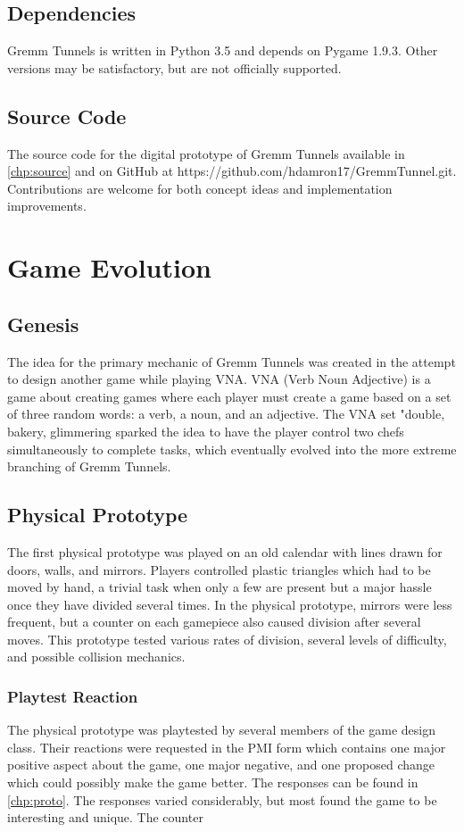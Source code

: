 \documentclass{scrreprt}
\begin{document}
		\section{Dependencies}
			Gremm Tunnels is written in Python 3.5 and depends on Pygame 1.9.3. Other versions may be satisfactory, but are not officially supported.
			
		\section{Source Code}
			The source code for the digital prototype of Gremm Tunnels available in \autoref{chp:source} and on GitHub at https://github.com/hdamron17/GremmTunnel.git. Contributions are welcome for both concept ideas and implementation improvements.
	
	\chapter{Game Evolution}
			
		\section{Genesis}
			The idea for the primary mechanic of Gremm Tunnels was created in the attempt to design another game while playing VNA. VNA (Verb Noun Adjective) is a game about creating games where each player must create a game based on a set of three random words: a verb, a noun, and an adjective. The VNA set "double, bakery, glimmering sparked the idea to have the player control two chefs simultaneously to complete tasks, which eventually evolved into the more extreme branching of Gremm Tunnels.
			
		\section{Physical Prototype}
			The first physical prototype was played on an old calendar with lines drawn for doors, walls, and mirrors. Players controlled plastic triangles which had to be moved by hand, a trivial task when only a few are present but a major hassle once they have divided several times. In the physical prototype, mirrors were less frequent, but a counter on each gamepiece also caused division after several moves. This prototype tested various rates of division, several levels of difficulty, and possible collision mechanics.
			
			\subsection{Playtest Reaction}
				The physical prototype was playtested by several members of the game design class. Their reactions were requested in the PMI form which contains one major positive aspect about the game, one major negative, and one proposed change which could possibly make the game better. The responses can be found in \autoref{chp:proto}. The responses varied considerably, but most found the game to be interesting and unique. The counter 
		
\end{document}
